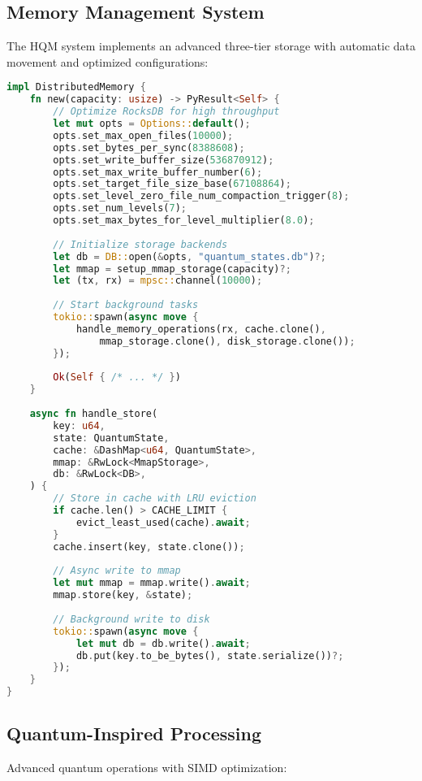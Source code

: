 \documentclass[10pt,twocolumn]{article}
\begin{document}
\subsection{Memory Management System}
The HQM system implements an advanced three-tier storage with automatic data movement and optimized configurations:

\begin{lstlisting}[language=Rust]
impl DistributedMemory {
    fn new(capacity: usize) -> PyResult<Self> {
        // Optimize RocksDB for high throughput
        let mut opts = Options::default();
        opts.set_max_open_files(10000);
        opts.set_bytes_per_sync(8388608);
        opts.set_write_buffer_size(536870912);
        opts.set_max_write_buffer_number(6);
        opts.set_target_file_size_base(67108864);
        opts.set_level_zero_file_num_compaction_trigger(8);
        opts.set_num_levels(7);
        opts.set_max_bytes_for_level_multiplier(8.0);
        
        // Initialize storage backends
        let db = DB::open(&opts, "quantum_states.db")?;
        let mmap = setup_mmap_storage(capacity)?;
        let (tx, rx) = mpsc::channel(10000);
        
        // Start background tasks
        tokio::spawn(async move {
            handle_memory_operations(rx, cache.clone(), 
                mmap_storage.clone(), disk_storage.clone());
        });
        
        Ok(Self { /* ... */ })
    }
    
    async fn handle_store(
        key: u64,
        state: QuantumState,
        cache: &DashMap<u64, QuantumState>,
        mmap: &RwLock<MmapStorage>,
        db: &RwLock<DB>,
    ) {
        // Store in cache with LRU eviction
        if cache.len() > CACHE_LIMIT {
            evict_least_used(cache).await;
        }
        cache.insert(key, state.clone());
        
        // Async write to mmap
        let mut mmap = mmap.write().await;
        mmap.store(key, &state);
        
        // Background write to disk
        tokio::spawn(async move {
            let mut db = db.write().await;
            db.put(key.to_be_bytes(), state.serialize())?;
        });
    }
}
\end{lstlisting}

\subsection{Quantum-Inspired Processing}
Advanced quantum operations with SIMD optimization:
\end{document}
